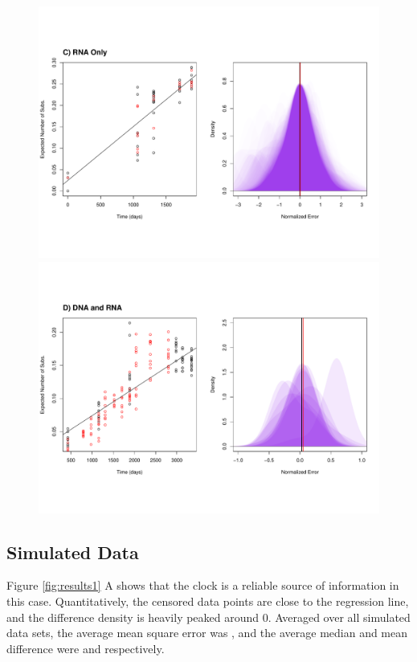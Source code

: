 \begin{figure} \label{fig:res}
	\centering
	\includegraphics[trim=0cm 0cm 0cm 7cm, clip=true,scale=0.425]{figures/ancre.pdf}\\
	\includegraphics[trim=0cm 4cm 0cm 7cm, clip=true,scale=0.425]{figures/lanl.pdf}
	\caption[Examples]{}
\end{figure}


\subsection{Simulated Data} \label{sec:sim_results}
Figure \ref{fig:results1} A shows that the clock is a reliable source of information in this case. Quantitatively, the censored data points are close to the regression line, and the difference density is heavily peaked around 0. Averaged over all simulated data sets, the average mean square error was , and the average median and mean difference were  and  respectively.

